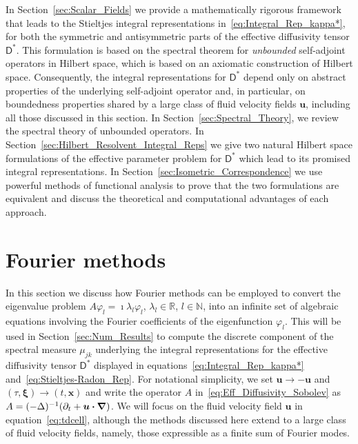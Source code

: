 \documentclass[leqno,onefignum,onetabnum]{siamltex1213}
\newcommand{\secref}[1]{Section~\ref{#1}}
\newcommand{\Dm}{\mathsf{D}}
\newcommand\bnabla{\mbox{\boldmath${\nabla}$}}
\providecommand\bcdot{\boldsymbol{\cdot}}
\newcommand{\vecx}{\boldsymbol{x}}
\newcommand{\vecu}{\boldsymbol{u}}
\newcommand{\vecxi}{\boldsymbol{\xi}}
\begin{document}
In \secref{sec:Scalar_Fields} we provide a mathematically rigorous
framework that leads to the Stieltjes integral representations
in~\eqref{eq:Integral_Rep_kappa*}, for both the symmetric and
antisymmetric parts of the effective diffusivity tensor $\Dm^*$. This
formulation is based on the spectral theorem for 
\emph{unbounded} self-adjoint operators in  Hilbert space, which is
based on an axiomatic construction of Hilbert 
space. Consequently, the integral representations for $\Dm^*$ depend
only on abstract properties of the underlying self-adjoint operator
and, in particular, on boundedness properties shared by a large
class of fluid velocity fields $\vecu$, including all those
discussed in this section. In \secref{sec:Spectral_Theory}, we
review the spectral theory of unbounded operators. In 
\secref{sec:Hilbert_Resolvent_Integral_Reps} we give two natural
Hilbert space formulations of the effective parameter problem for
$\Dm^*$ which lead to its promised integral representations. In
\secref{sec:Isometric_Correspondence} we use powerful methods of
functional analysis to prove that the two formulations are equivalent
and discuss the theoretical and computational advantages of each
approach.  



  
\section{Fourier methods}
\label{sec:Fourier_Methods} 
%
In this section we discuss how Fourier methods can be employed to
convert the eigenvalue problem $A\varphi_l=\imath\lambda_l\varphi_l$, $\lambda_l\in\mathbb{R}$,
$l\in\mathbb{N}$, into an infinite set of algebraic equations involving
the Fourier coefficients of the eigenfunction $\varphi_l$. This will be used
in \secref{sec:Num_Results} to compute the discrete component of the
spectral measure $\mu_{jk}$ underlying the integral representations for
the effective diffusivity tensor $\Dm^*$ displayed in
equations~\eqref{eq:Integral_Rep_kappa*}
and~\eqref{eq:Stieltjes-Radon_Rep}.  For notational simplicity, we set
$\vecu\to-\vecu$ and $(\tau,\vecxi)\to(t,\vecx)$ and write the operator $A$
in~\eqref{eq:Eff_Diffusivity_Sobolev} as
$A=(-\Delta)^{-1}(\partial_t+\vecu\bcdot\bnabla)$. We will focus on the fluid
velocity field $\vecu$ in equation~\eqref{eq:tdcell}, although the methods
discussed here extend to a large class of fluid velocity fields,
namely, those expressible as a finite sum of Fourier modes.
\end{document}
